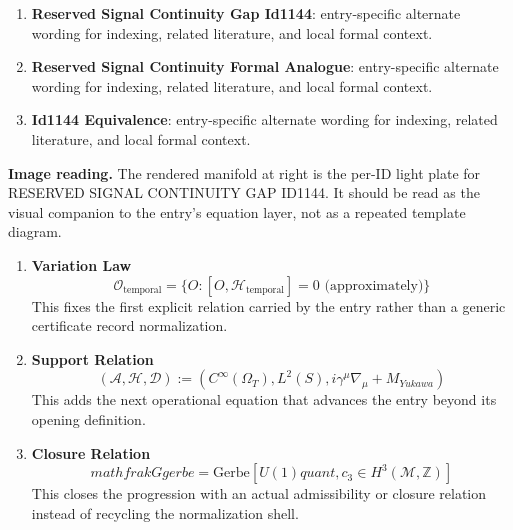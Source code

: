 \begin{enumerate}[leftmargin=1.6em,itemsep=6pt,topsep=4pt]
\item \textbf{Reserved Signal Continuity Gap Id1144}: entry-specific alternate wording for indexing, related literature, and local formal context.
\item \textbf{Reserved Signal Continuity Formal Analogue}: entry-specific alternate wording for indexing, related literature, and local formal context.
\item \textbf{Id1144 Equivalence}: entry-specific alternate wording for indexing, related literature, and local formal context.
\end{enumerate}

\begin{samepage}
\noindent\begin{minipage}[t]{0.45\linewidth}
\vspace{0pt}
\raggedright
\scriptsize\textbf{Image reading.} The rendered manifold at right is the per-ID light plate for RESERVED SIGNAL CONTINUITY GAP ID1144. It should be read as the visual companion to the entry's equation layer, not as a repeated template diagram.\par
\end{minipage}\hfill
\begin{minipage}[t]{0.53\linewidth}
\vspace*{-0.10in}
\raggedright
{}
\end{minipage}
\end{samepage}

\clearpage


\begin{enumerate}[leftmargin=1.6em,itemsep=9pt,topsep=6pt]
\item \textbf{Variation Law}
\[
\mathcal{O}_{\text{temporal}} = \{O : [O, \mathcal{H}_{\text{temporal}}] = 0 \text{ (approximately)}\}
\]
This fixes the first explicit relation carried by the entry rather than a generic certificate record normalization.

\item \textbf{Support Relation}
\[
(\mathcal{A}, \mathcal{H}, \mathcal{D}) := (C^\infty(\Omega_T), L^2(S), i\gamma^\mu\nabla_\mu + M_{Yukawa})
\]
This adds the next operational equation that advances the entry beyond its opening definition.

\item \textbf{Closure Relation}
\[
mathfrak{G} {gerbe} = \text{Gerbe}[U(1) {quant}, c_3 \in H^3(\mathcal{M}, \mathbb{Z})]
\]
This closes the progression with an actual admissibility or closure relation instead of recycling the normalization shell.
\end{enumerate}

